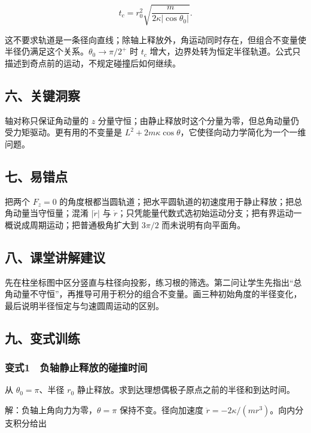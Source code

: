 \documentclass[12pt,a4paper,fontset=fandol]{ctexart}
\begin{document}
\[t_c=r_0^2\sqrt{\frac{m}{2\kappa|\cos\theta_0|}}.\]

这不要求轨道是一条径向直线；除轴上释放外，角运动同时存在，但组合不变量使半径仍满足这个关系。\(\theta_0\to\pi/2^+\)
时 \(t_c\)
增大，边界处转为恒定半径轨道。公式只描述到奇点前的运动，不规定碰撞后如何继续。

\subsection{六、关键洞察}\label{ux516dux5173ux952eux6d1eux5bdf-4}

轴对称只保证角动量的 \(z\)
分量守恒；由静止释放时这个分量为零，但总角动量仍受力矩驱动。更有用的不变量是
\(L^2+2m\kappa\cos\theta\)，它使径向动力学简化为一个一维问题。

\subsection{七、易错点}\label{ux4e03ux6613ux9519ux70b9-4}

把两个 \(F_z=0\)
的角度根都当圆轨道；把水平圆轨道的初速度用于静止释放；把总角动量当守恒量；混淆
\(|\dot r|\) 与
\(\dot r\)；只凭能量代数式选初始运动分支；把有界运动一概说成周期运动；把普通极角扩大到
\(3\pi/2\) 而未说明有向平面角。

\subsection{八、课堂讲解建议}\label{ux516bux8bfeux5802ux8bb2ux89e3ux5efaux8bae-4}

先在柱坐标图中区分竖直与柱径向投影，练习根的筛选。第二问让学生先指出``总角动量不守恒''，再推导可用于积分的组合不变量。画三种初始角度的半径变化，最后说明半径恒定与匀速圆周运动的区别。

\subsection{九、变式训练}\label{ux4e5dux53d8ux5f0fux8badux7ec3-4}

\subsubsection{变式1　负轴静止释放的碰撞时间}\label{ux53d8ux5f0f1-ux8d1fux8f74ux9759ux6b62ux91caux653eux7684ux78b0ux649eux65f6ux95f4}

从 \(\theta_0=\pi\)、半径 \(r_0\)
静止释放。求到达理想偶极子原点之前的半径和到达时间。

解：负轴上角向力为零，\(\theta=\pi\) 保持不变。径向加速度
\(\ddot r=-2\kappa/(mr^3)\)。向内分支积分给出
\end{document}
